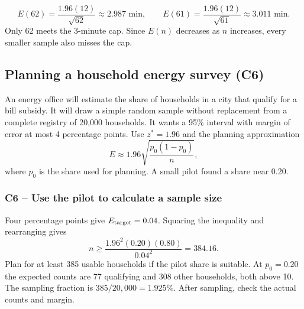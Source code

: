 	\[
	E(62)=\frac{1.96(12)}{\sqrt{62}}\approx 2.987\text{ min},
	\qquad E(61)=\frac{1.96(12)}{\sqrt{61}}\approx 3.011\text{ min}.
	\]
	Only 62 meets the 3-minute cap. Since $E(n)$ decreases as $n$ increases, every smaller sample also misses the cap.


	\clearpage

	\subsection{Planning a household energy survey (C6)}
	\label{prob:c6-2}

	An energy office will estimate the share of households in a city that qualify for a bill subsidy. It will draw a simple random sample without replacement from a complete registry of 20,000 households. It wants a 95\% interval with margin of error at most 4 percentage points. Use $z^*=1.96$ and the planning approximation
	\[
	E\approx 1.96\sqrt{\frac{p_0(1-p_0)}{n}},
	\]
	where $p_0$ is the share used for planning. A small pilot found a share near 0.20.


	\label{sol:c6-2-a}
	\subsubsection*{C6 -- Use the pilot to calculate a sample size}

	Four percentage points give $E_{\rm target}=0.04$. Squaring the inequality and rearranging gives
	\[
	n\ge \frac{1.96^2(0.20)(0.80)}{0.04^2}=384.16.
	\]
	Plan for at least 385 usable households if the pilot share is suitable. At $p_0=0.20$ the expected counts are 77 qualifying and 308 other households, both above 10. The sampling fraction is $385/20{,}000=1.925\%$. After sampling, check the actual counts and margin.


	\label{sol:c6-2-b}
